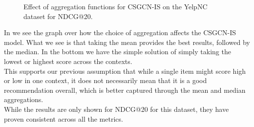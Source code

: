 \begin{figure}
    \caption{Effect of aggregation functions for CSGCN-IS on the YelpNC dataset for NDCG@20.}
    \label{fig:aggregation_effect}
\end{figure}
In  we see the graph over how the choice of aggregation affects the CSGCN-IS model.
What we see is that taking the mean provides the best results, followed by the median.
In the bottom we have the simple solution of simply taking the lowest or highest score across the contexts.\\
This supports our previous assumption that while a single item might score high or low in one context, it does not necessarily mean that it is a good recommendation overall, which is better captured through the mean and median aggregations.\\
While the results are only shown for NDCG@20 for this dataset, they have proven consistent across all the metrics.
\\\\
